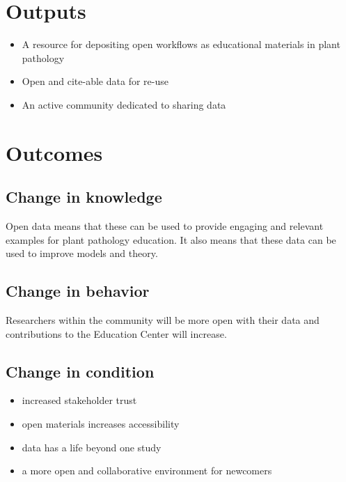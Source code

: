 \documentclass[12pt,letterpaper]{article}
\begin{document}
\section{Outputs}

\begin{itemize}
	\item A resource for depositing open workflows as educational materials in plant pathology
	\item Open and cite-able data for re-use
	\item An active community dedicated to sharing data
\end{itemize}

\section{Outcomes}


\subsection{Change in knowledge}

Open data means that these can be used to provide engaging and relevant examples for plant pathology education. It also means that these data can be used to improve models and theory. 

\subsection{Change in behavior}

Researchers within the community will be more open with their data and contributions to the Education Center will increase.

\subsection{Change in condition}

\begin{itemize}
	\item increased stakeholder trust
	\item open materials increases accessibility 
	\item data has a life beyond one study
	\item a more open and collaborative environment for newcomers
\end{itemize}
\end{document}
